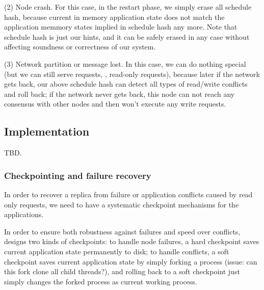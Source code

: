 (2) Node crash. For this case, in the restart phase, we simply erase all 
schedule hash, because current in memory application state does not match the 
application memmory states implied in schedule hash any more. Note that 
schedule hash is just our hints, and it can be safely erased in any case 
without affecting soundness or correctness of our system.

(3) Network partition or \paxos message lost. In this case, we can do nothing 
special (but we can still serve requests, \eg, read-only requests), because 
later if the network gets back, our above schedule hash can detect all types of 
read/write conflicts and roll back; if the network never gets back, this node 
can not reach any consensus with other nodes and then won't execute any write 
requests.



\subsection{Implementation} \label{sec:rep-impl}
TBD.

\subsubsection{Checkpointing and failure recovery} \label{sec:rep-checkpoint}
In order to recover a replica from failure or application conflicts caused by 
read only requests, we need to have a systematic checkpoint mechanisms for the applications.

In order to ensure both robustness against failures and speed over conflicts, 
\msmr designs two kinds of checkpoints: to handle node failures, a hard checkpoint saves current application 
state permanently to 
disk; to handle conflicts, a soft checkpoint saves current application state by 
simply forking a process (issue: can this fork clone all child threads?), and 
rolling back to a soft checkpoint just simply changes the forked process as 
current working process.

